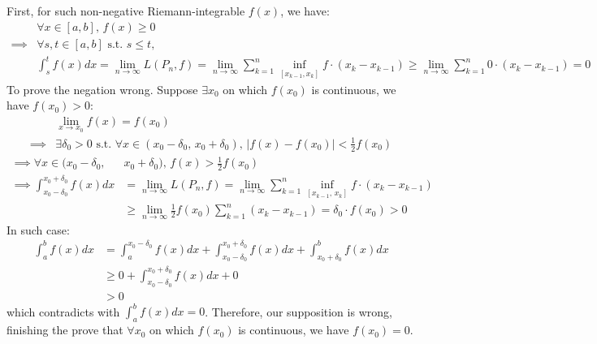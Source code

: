 \documentclass{article}
\begin{document}
\section{}
First, for such non-negative Riemann-integrable $f(x)$, we have:
$$\begin{aligned}
&\forall x \in [a,b] ,\, f(x) \ge 0 \\
\implies &\forall s,t \in [a,b] \text{ s.t. } s \le t , \\
&\int_s^t f(x)dx = \lim_{n\to\infty} L(P_n,f) = \lim_{n\to\infty} \sum_{k=1}^n \inf_{[x_{k-1} , x_k]} f \cdot (x_k - x_{k-1}) \ge \lim_{n\to\infty} \sum_{k=1}^n 0 \cdot (x_k - x_{k-1}) = 0
\end{aligned}$$
To prove the negation wrong. Suppose $\exists x_0$ on which $f(x_0)$ is continuous, we have $f(x_0)>0$:
$$\begin{aligned}
&\lim_{x\to x_0} f(x) = f(x_0) \\
\implies &\exists \delta_0>0 \text{ s.t. } \forall x\in(x_0 - \delta_0 ,\, x_0 + \delta_0) ,\, \left| f(x) - f(x_0) \right| < \frac{1}{2} f(x_0) 
\end{aligned}$$
$$\begin{aligned}
\implies \forall x\in(x_0 - \delta_0 ,\, &x_0 + \delta_0) ,\, f(x) > \frac{1}{2} f(x_0) \\
\implies \int_{x_0 - \delta_0}^{x_0 + \delta_0} f(x) dx &= \lim_{n\to\infty} L(P_n,f) = \lim_{n\to\infty} \sum_{k=1}^n \inf_{[x_{k-1} ,\, x_k]} f \cdot (x_k - x_{k-1}) \\
&\ge \lim_{n\to\infty} \frac{1}{2} f(x_0) \sum_{k=1}^n (x_k - x_{k-1}) = \delta_0 \cdot f(x_0) > 0
\end{aligned}$$
In such case:
$$\begin{aligned}
\int_a^b f(x) dx &= \int_a^{x_0 - \delta_0} f(x) dx + \int_{x_0 - \delta_0}^{x_0 + \delta_0} f(x) dx + \int_{x_0 + \delta_0}^b f(x) dx \\
&\ge 0 + \int_{x_0 - \delta_0}^{x_0 + \delta_0} f(x) dx + 0 \\
&>0
\end{aligned}$$
which contradicts with $\int_a^b f(x)dx = 0$. Therefore, our supposition is wrong, finishing the prove that $\forall x_0$ on which $f(x_0)$ is continuous, we have $f(x_0)=0$.

\section{}
\end{document}
